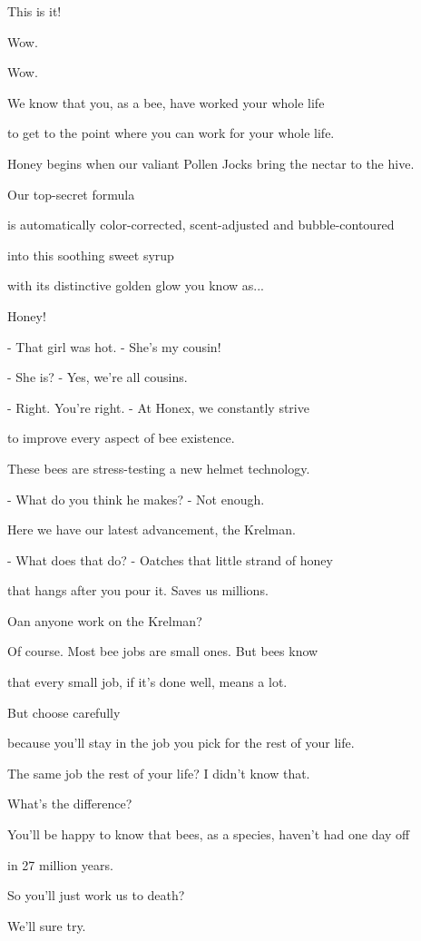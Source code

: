 \documentclass[journal]{IEEEtran}
\begin{document}
  
This is it!

  
Wow.

  
Wow.

  
We know that you, as a bee,
have worked your whole life

  
to get to the point where you
can work for your whole life.

  
Honey begins when our valiant Pollen
Jocks bring the nectar to the hive.

  
Our top-secret formula

  
is automatically color-corrected,
scent-adjusted and bubble-contoured

  
into this soothing sweet syrup

  
with its distinctive
golden glow you know as...

  
Honey!

  
- That girl was hot.
- She's my cousin!

  
- She is?
- Yes, we're all cousins.

  
- Right. You're right.
- At Honex, we constantly strive

  
to improve every aspect
of bee existence.

  
These bees are stress-testing
a new helmet technology.

  
- What do you think he makes?
- Not enough.

  
Here we have our latest advancement,
the Krelman.

  
- What does that do?
- Oatches that little strand of honey

  
that hangs after you pour it.
Saves us millions.

  
Oan anyone work on the Krelman?

  
Of course. Most bee jobs are
small ones. But bees know

  
that every small job,
if it's done well, means a lot.

  
But choose carefully

  
because you'll stay in the job
you pick for the rest of your life.

  
The same job the rest of your life?
I didn't know that.

  
What's the difference?

  
You'll be happy to know that bees,
as a species, haven't had one day off

  
in 27 million years.

  
So you'll just work us to death?

  
We'll sure try.
\end{document}
